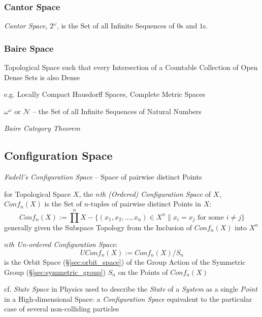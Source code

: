 \subsubsection{Cantor Space}\label{sec:cantor_space}

\emph{Cantor Space}, $2^{\omega}$, is the Set of all Infinite
Sequences of $0$s and $1$s.



\subsubsection{Baire Space}\label{sec:baire_space}

Topological Space such that every Intersection of a Countable Collection of Open
Dense Sets is also Dense

e.g. Locally Compact Hausdorff Spaces, Complete Metric Spaces

$\omega^{\omega}$ or $\mathcal{N}$ -- the Set of all Infinite Sequences of
Natural Numbers

\emph{Baire Category Theorem}



\subsection{Configuration Space}\label{sec:configuration_space}

\emph{Fadell's Configuration Space} -- Space of pairwise distinct Points

for Topological Space $X$, the \emph{$n$th (Ordered) Configuration Space} of
$X$, $Conf_n(X)$ is the Set of $n$-tuples of pairwise distinct Points in $X$:
\[
  Conf_n(X) := \prod^n X - \{(x_1, x_2, \ldots, x_n) \in X^n
    \| x_i = x_j \text{ for some } i \neq j \}
\]
generally given the Subspace Topology from the Inclusion of $Conf_n(X)$ into
$X^n$

\emph{$n$th Un-ordered Configuration Space}:
\[
  UConf_n(X) := Conf_n(X)/S_n
\]
is the Orbit Space (\S\ref{sec:orbit_space}) of the Group Action of the
Symmetric Group (\S\ref{sec:symmetric_group}) $S_n$ on the Points of $Conf_n(X)$

cf. \emph{State Space} in Physics used to describe the \emph{State} of a
\emph{System} as a single \emph{Point} in a High-dimensional Space: a
\emph{Configuration Space} equivalent to the particular case of several
non-colliding particles

